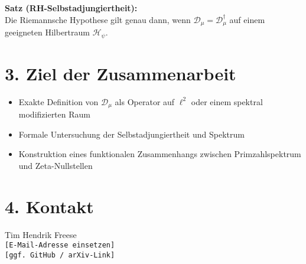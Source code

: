 \documentclass[12pt]{article}
\begin{document}
\textbf{Satz (RH-Selbstadjungiertheit):} \\
Die Riemannsche Hypothese gilt genau dann, wenn $\mathcal{D}_\mu = \mathcal{D}_\mu^\dagger$ auf einem geeigneten Hilbertraum $\mathcal{H}_\psi$.

\section*{3. Ziel der Zusammenarbeit}

\begin{itemize}
  \item Exakte Definition von $\mathcal{D}_\mu$ als Operator auf $\ell^2$ oder einem spektral modifizierten Raum
  \item Formale Untersuchung der Selbstadjungiertheit und Spektrum
  \item Konstruktion eines funktionalen Zusammenhangs zwischen Primzahlspektrum und Zeta-Nullstellen
\end{itemize}

\section*{4. Kontakt}
Tim Hendrik Freese\\
\texttt{[E-Mail-Adresse einsetzen]}\\
\texttt{[ggf. GitHub / arXiv-Link]}
\end{document}
